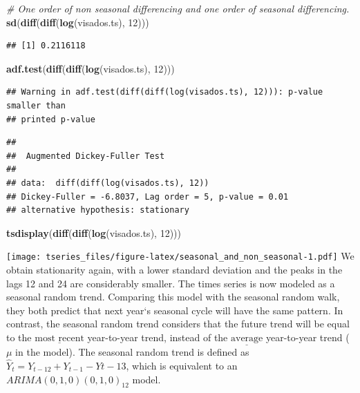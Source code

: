 \documentclass[]{article}
\newenvironment{Shaded}{\begin{snugshade}}{\end{snugshade}}
\newcommand{\KeywordTok}[1]{\textcolor[rgb]{0.13,0.29,0.53}{\textbf{{#1}}}}
\newcommand{\DecValTok}[1]{\textcolor[rgb]{0.00,0.00,0.81}{{#1}}}
\newcommand{\CommentTok}[1]{\textcolor[rgb]{0.56,0.35,0.01}{\textit{{#1}}}}
\newcommand{\NormalTok}[1]{{#1}}
\begin{document}
\begin{Shaded}
\begin{Highlighting}[]
\CommentTok{# One order of non seasonal differencing and one order of seasonal differencing.}
\KeywordTok{sd}\NormalTok{(}\KeywordTok{diff}\NormalTok{(}\KeywordTok{diff}\NormalTok{(}\KeywordTok{log}\NormalTok{(visados.ts), }\DecValTok{12}\NormalTok{)))}
\end{Highlighting}
\end{Shaded}

\begin{verbatim}
## [1] 0.2116118
\end{verbatim}

\begin{Shaded}
\begin{Highlighting}[]
\KeywordTok{adf.test}\NormalTok{(}\KeywordTok{diff}\NormalTok{(}\KeywordTok{diff}\NormalTok{(}\KeywordTok{log}\NormalTok{(visados.ts), }\DecValTok{12}\NormalTok{)))}
\end{Highlighting}
\end{Shaded}

\begin{verbatim}
## Warning in adf.test(diff(diff(log(visados.ts), 12))): p-value smaller than
## printed p-value
\end{verbatim}

\begin{verbatim}
## 
##  Augmented Dickey-Fuller Test
## 
## data:  diff(diff(log(visados.ts), 12))
## Dickey-Fuller = -6.8037, Lag order = 5, p-value = 0.01
## alternative hypothesis: stationary
\end{verbatim}

\begin{Shaded}
\begin{Highlighting}[]
\KeywordTok{tsdisplay}\NormalTok{(}\KeywordTok{diff}\NormalTok{(}\KeywordTok{diff}\NormalTok{(}\KeywordTok{log}\NormalTok{(visados.ts), }\DecValTok{12}\NormalTok{)))}
\end{Highlighting}
\end{Shaded}

\texttt{[image: tseries\_files/figure-latex/seasonal\_and\_non\_seasonal-1.pdf]}
We obtain stationarity again, with a lower standard deviation and the
peaks in the lags 12 and 24 are considerably smaller. The times series
is now modeled as a seasonal random trend. Comparing this model with the
seasonal random walk, they both predict that next year`s seasonal cycle
will have the same pattern. In contrast, the seasonal random trend
considers that the future trend will be equal to the
\(\underline{\text{most recent}}\) year-to-year trend, instead of the
\(\underline{\text{average}}\) year-to-year trend (\(\mu\) in the
model). The seasonal random trend is defined as
\(\hat{Y}_t = Y_{t-12} + Y_{t-1} - Y{t-13}\), which is equivalent to an
\(ARIMA(0,1,0)(0,1,0)_{12}\) model.
\end{document}
